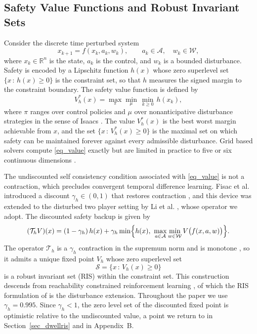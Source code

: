 \documentclass[journal]{IEEEtran}
\begin{document}
\subsection{Safety Value Functions and Robust Invariant Sets}

Consider the discrete time perturbed system
\begin{equation}
x_{k+1} = f(x_k, a_k, w_k), \qquad a_k \in \mathcal{A}, \quad w_k \in \mathcal{W},
\label{eq_plant}
\end{equation}
where $x_k \in \mathbb{R}^n$ is the state, $a_k$ is the control, and $w_k$ is a bounded disturbance. Safety is encoded by a Lipschitz function $h(x)$ whose zero superlevel set $\{x \,:\, h(x) \ge 0\}$ is the constraint set, so that $h$ measures the signed margin to the constraint boundary. The safety value function is defined by
\begin{equation}
V_h^{*}(x) = \max_{\pi} \min_{\mu} \, \min_{k \ge 0} \, h(x_k),
\label{eq_value}
\end{equation}
where $\pi$ ranges over control policies and $\mu$ over nonanticipative disturbance strategies in the sense of Isaacs \cite{isaacs1965,bansal2017}. The value $V_h^{*}(x)$ is the best worst margin achievable from $x$, and the set $\{x \,:\, V_h^{*}(x) \ge 0\}$ is the maximal set on which safety can be maintained forever against every admissible disturbance. Grid based solvers compute \eqref{eq_value} exactly but are limited in practice to five or six continuous dimensions \cite{mitchell2005,bansal2017}.

The undiscounted self consistency condition associated with \eqref{eq_value} is not a contraction, which precludes convergent temporal difference learning. Fisac et al. introduced a discount $\gamma_h \in (0,1)$ that restores contraction \cite{fisac2019}, and this device was extended to the disturbed two player setting by Li et al. \cite{li2023cdc}, whose operator we adopt. The discounted safety backup is given by
\begin{equation}
(\mathcal{T}_h V)(x) = (1-\gamma_h)\, h(x) + \gamma_h \min\Bigl\{ h(x),\ \max_{a \in \mathcal{A}} \min_{w \in \mathcal{W}} V\bigl(f(x,a,w)\bigr) \Bigr\}.
\label{eq_backup}
\end{equation}
The operator $\mathcal{T}_h$ is a $\gamma_h$ contraction in the supremum norm and is monotone \cite[Theorems~2 and~3]{li2023cdc}, so it admits a unique fixed point $V_h$ whose zero superlevel set
\begin{equation}
\mathcal{S} = \{x \,:\, V_h(x) \ge 0\}
\label{eq_ris}
\end{equation}
is a robust invariant set (RIS) within the constraint set. This construction descends from reachability constrained reinforcement learning \cite{yu2022}, of which the RIS formulation of \cite{li2023cdc} is the disturbance extension. Throughout the paper we use $\gamma_h = 0.995$. Since $\gamma_h < 1$, the zero level set of the discounted fixed point is optimistic relative to the undiscounted value, a point we return to in Section~\ref{sec_dwellris} and in Appendix~B.
\end{document}
